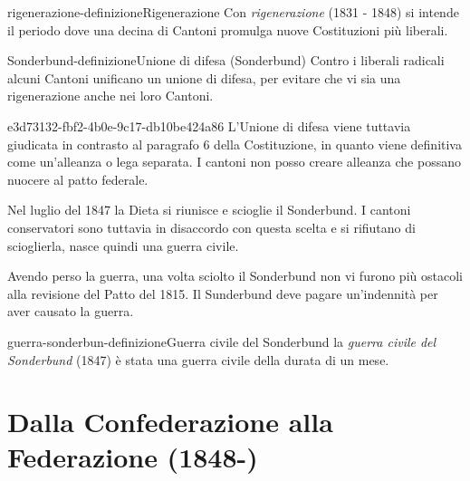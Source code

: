 \documentclass[preview]{standalone}
\begin{document}
\begin{snippetdefinition}{rigenerazione-definizione}{Rigenerazione}
    Con \textit{rigenerazione} (1831 - 1848) si intende il periodo dove una decina di Cantoni promulga nuove Costituzioni più liberali.
\end{snippetdefinition}

\begin{snippetdefinition}{Sonderbund-definizione}{Unione di difesa (Sonderbund)}
    Contro i liberali radicali alcuni Cantoni unificano un unione di difesa,
    per evitare che vi sia una rigenerazione anche nei loro Cantoni.
\end{snippetdefinition}

\begin{snippet}{e3d73132-fbf2-4b0e-9c17-db10be424a86}
    L'Unione di difesa viene tuttavia giudicata in contrasto al paragrafo 6 della Costituzione, in quanto
    viene definitiva come un'alleanza o lega separata.
    I cantoni non posso creare alleanza che possano nuocere al patto federale.
    
    Nel luglio del 1847 la Dieta si riunisce e scioglie il Sonderbund.
    I cantoni conservatori sono tuttavia in disaccordo con questa scelta e si rifiutano di scioglierla,
    nasce quindi una guerra civile.
    
    Avendo perso la guerra, una volta sciolto il Sonderbund non vi furono più ostacoli alla revisione del Patto del 1815.
    Il Sunderbund deve pagare un'indennità per aver causato la guerra.
\end{snippet}

\begin{snippetdefinition}{guerra-sonderbun-definizione}{Guerra civile del Sonderbund}
    la \textit{guerra civile del Sonderbund} (1847) è stata una guerra civile
    della durata di un mese.
\end{snippetdefinition}


\section{Dalla Confederazione alla Federazione (1848-)}
\end{document}
